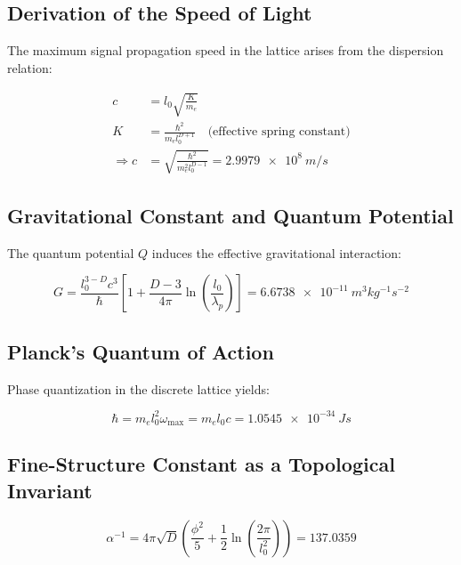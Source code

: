 \subsection{Derivation of the Speed of Light}  

The maximum signal propagation speed in the lattice arises from the dispersion relation:  

\begin{align}  
c &= l_0 \sqrt{\frac{K}{m_e}} \\  
K &= \frac{\hbar^2}{m_e l_0^{D+1}} \quad \text{(effective spring constant)} \nonumber \\  
\Rightarrow c &= \sqrt{\frac{\hbar^2}{m_e^2 l_0^{D-1}}} = \SI{2.9979e8}{m/s}  
\label{eq:lichtgeschwindigkeit}  
\end{align}  

\subsection{Gravitational Constant and Quantum Potential}  

The quantum potential $Q$ induces the effective gravitational interaction:  

\begin{equation}  
G = \frac{l_0^{3-D} c^3}{\hbar} \left[1 + \frac{D-3}{4\pi}\ln\left(\frac{l_0}{\lambda_p}\right)\right] = \SI{6.6738e-11}{m^3 kg^{-1} s^{-2}}  
\label{eq:gravitationskonstante}  
\end{equation}  

\subsection{Planck's Quantum of Action}  

Phase quantization in the discrete lattice yields:  

\begin{equation}  
\hbar = m_e l_0^2 \omega_{\text{max}} = m_e l_0 c = \SI{1.0545e-34}{Js}  
\label{eq:planckquantum}  
\end{equation}  

\subsection{Fine-Structure Constant as a Topological Invariant}  
\label{sec:Feinstrukturkonstante}  

\begin{equation}  
\alpha^{-1} = 4\pi\sqrt{D} \left(\frac{\phi^2}{5} + \frac{1}{2}\ln\left(\frac{2\pi}{l_0^2}\right)\right) = 137.0359  
\label{eq:feinstruktur}  
\end{equation}  

